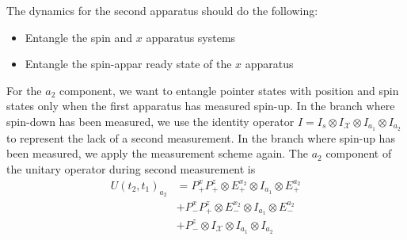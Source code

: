 The dynamics for the second apparatus should do the following:
\begin{itemize}
  \item Entangle the spin and $x$ apparatus systems
  \item Entangle the spin-appar ready state of the $x$ apparatus
\end{itemize}

For the $a_2$ component, we want to entangle pointer states with position and spin states only when the first apparatus has measured spin-up. In the branch where spin-down has been measured, we use the identity operator $I = I_s \otimes I_\mathcal{X} \otimes I_{a_1} \otimes I_{a_2}$ to represent the lack of a second measurement. In the branch where spin-up has been measured, we apply the measurement scheme again. The $a_2$ component of the unitary operator during second measurement is
\begin{align}
  U(t_2, t_1)_{a_2} &= P^x_+ P^z_+ \otimes E^{x_2}_+ \otimes I_{a_1} \otimes E^{a_2}_+ \\ \nonumber
  &+ P^x_- P^z_+ \otimes E^{x_2}_- \otimes I_{a_1} \otimes E^{a_2}_- \\ \nonumber
  &+ P^z_- \otimes{I_\mathcal{X}} \otimes I_{a_1} \otimes I_{a_2}
\end{align}


